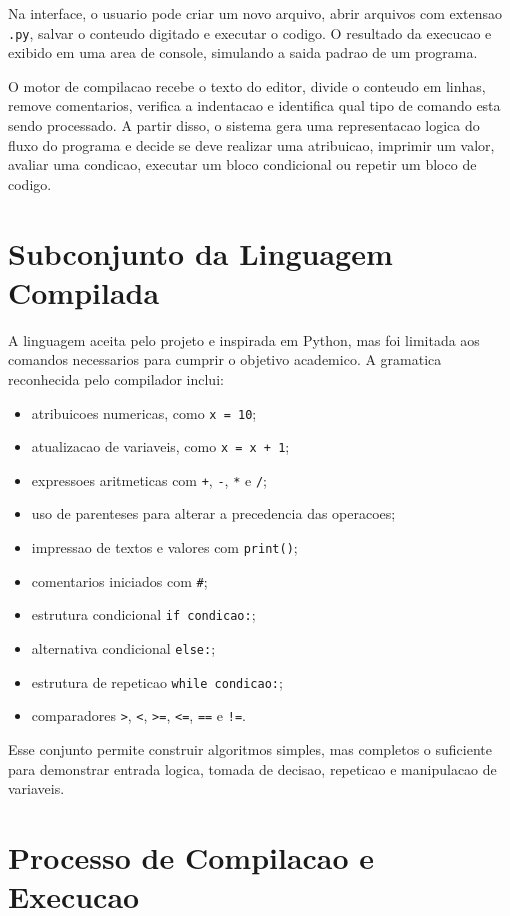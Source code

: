 \documentclass[12pt,a4paper]{article}
\begin{document}
Na interface, o usuario pode criar um novo arquivo, abrir arquivos com extensao \texttt{.py}, salvar o conteudo digitado e executar o codigo. O resultado da execucao e exibido em uma area de console, simulando a saida padrao de um programa.

O motor de compilacao recebe o texto do editor, divide o conteudo em linhas, remove comentarios, verifica a indentacao e identifica qual tipo de comando esta sendo processado. A partir disso, o sistema gera uma representacao logica do fluxo do programa e decide se deve realizar uma atribuicao, imprimir um valor, avaliar uma condicao, executar um bloco condicional ou repetir um bloco de codigo.

\section{Subconjunto da Linguagem Compilada}

A linguagem aceita pelo projeto e inspirada em Python, mas foi limitada aos comandos necessarios para cumprir o objetivo academico. A gramatica reconhecida pelo compilador inclui:

\begin{itemize}
    \item atribuicoes numericas, como \texttt{x = 10};
    \item atualizacao de variaveis, como \texttt{x = x + 1};
    \item expressoes aritmeticas com \texttt{+}, \texttt{-}, \texttt{*} e \texttt{/};
    \item uso de parenteses para alterar a precedencia das operacoes;
    \item impressao de textos e valores com \texttt{print()};
    \item comentarios iniciados com \texttt{\#};
    \item estrutura condicional \texttt{if condicao:};
    \item alternativa condicional \texttt{else:};
    \item estrutura de repeticao \texttt{while condicao:};
    \item comparadores \texttt{>}, \texttt{<}, \texttt{>=}, \texttt{<=}, \texttt{==} e \texttt{!=}.
\end{itemize}

Esse conjunto permite construir algoritmos simples, mas completos o suficiente para demonstrar entrada logica, tomada de decisao, repeticao e manipulacao de variaveis.

\section{Processo de Compilacao e Execucao}
\end{document}

